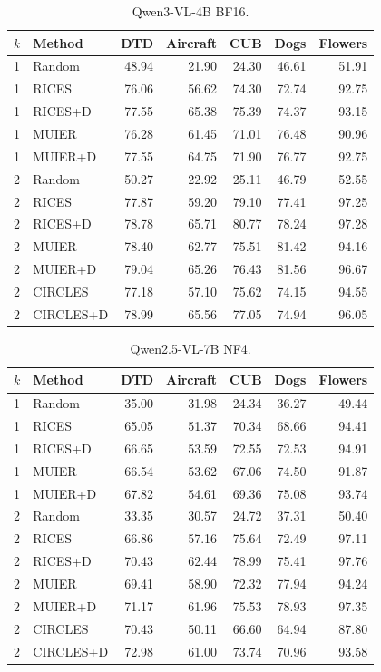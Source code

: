 \documentclass[10pt,twocolumn,letterpaper]{article}
\begin{document}
\begin{table}[t]
\caption{Qwen3-VL-4B BF16.}
\label{sup:full_main_0}
\centering\small
\begin{tabular}{llrrrrr}
\toprule
$k$ & Method & DTD & Aircraft & CUB & Dogs & Flowers \\
\midrule
1 & Random & 48.94 & 21.90 & 24.30 & 46.61 & 51.91 \\
1 & RICES & 76.06 & 56.62 & 74.30 & 72.74 & 92.75 \\
1 & RICES+D & 77.55 & 65.38 & 75.39 & 74.37 & 93.15 \\
1 & MUIER & 76.28 & 61.45 & 71.01 & 76.48 & 90.96 \\
1 & MUIER+D & 77.55 & 64.75 & 71.90 & 76.77 & 92.75 \\
2 & Random & 50.27 & 22.92 & 25.11 & 46.79 & 52.55 \\
2 & RICES & 77.87 & 59.20 & 79.10 & 77.41 & 97.25 \\
2 & RICES+D & 78.78 & 65.71 & 80.77 & 78.24 & 97.28 \\
2 & MUIER & 78.40 & 62.77 & 75.51 & 81.42 & 94.16 \\
2 & MUIER+D & 79.04 & 65.26 & 76.43 & 81.56 & 96.67 \\
2 & CIRCLES & 77.18 & 57.10 & 75.62 & 74.15 & 94.55 \\
2 & CIRCLES+D & 78.99 & 65.56 & 77.05 & 74.94 & 96.05 \\
\bottomrule
\end{tabular}
\end{table}
\begin{table}[t]
\caption{Qwen2.5-VL-7B NF4.}
\label{sup:full_main_1}
\centering\small
\begin{tabular}{llrrrrr}
\toprule
$k$ & Method & DTD & Aircraft & CUB & Dogs & Flowers \\
\midrule
1 & Random & 35.00 & 31.98 & 24.34 & 36.27 & 49.44 \\
1 & RICES & 65.05 & 51.37 & 70.34 & 68.66 & 94.41 \\
1 & RICES+D & 66.65 & 53.59 & 72.55 & 72.53 & 94.91 \\
1 & MUIER & 66.54 & 53.62 & 67.06 & 74.50 & 91.87 \\
1 & MUIER+D & 67.82 & 54.61 & 69.36 & 75.08 & 93.74 \\
2 & Random & 33.35 & 30.57 & 24.72 & 37.31 & 50.40 \\
2 & RICES & 66.86 & 57.16 & 75.64 & 72.49 & 97.11 \\
2 & RICES+D & 70.43 & 62.44 & 78.99 & 75.41 & 97.76 \\
2 & MUIER & 69.41 & 58.90 & 72.32 & 77.94 & 94.24 \\
2 & MUIER+D & 71.17 & 61.96 & 75.53 & 78.93 & 97.35 \\
2 & CIRCLES & 70.43 & 50.11 & 66.60 & 64.94 & 87.80 \\
2 & CIRCLES+D & 72.98 & 61.00 & 73.74 & 70.96 & 93.58 \\
\bottomrule
\end{tabular}
\end{table}
\end{document}
